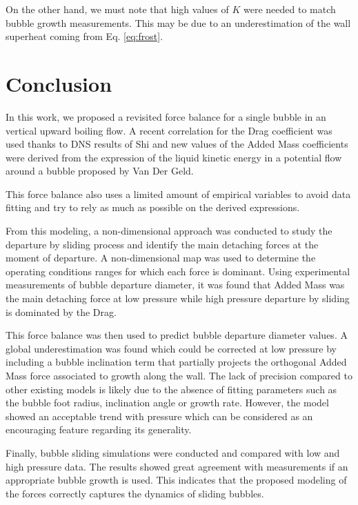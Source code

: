 On the other hand, we must note that high values of $K$ were needed to match bubble growth measurements. This may be due to an underestimation of the wall superheat coming from Eq. \ref{eq:frost}.



\section{Conclusion}\label{ccl}

In this work, we proposed a revisited force balance for a single bubble in an vertical upward boiling flow. A recent correlation for the Drag coefficient was used thanks to DNS results of Shi \etal and new values of the Added Mass coefficients were derived from the expression of the liquid kinetic energy in a potential flow around a bubble proposed by Van Der Geld.

This force balance also uses a limited amount of empirical variables to avoid data fitting and try to rely as much as possible on the derived expressions.

From this modeling, a non-dimensional approach was conducted to study the departure by sliding process and identify the main detaching forces at the moment of departure. A non-dimensional map was used to determine the operating conditions ranges for which each force is dominant. Using experimental measurements of bubble departure diameter, it was found that Added Mass was the main detaching force at low pressure while high pressure departure by sliding is dominated by the Drag.

This force balance was then used to predict bubble departure diameter values. A global underestimation was found which could be corrected at low pressure by including a bubble inclination term that partially projects the orthogonal Added Mass force associated to growth along the wall. The lack of precision compared to other existing models is likely due to the absence of fitting parameters such as the bubble foot radius, inclination angle or growth rate. However, the model showed an acceptable trend with pressure which can be considered as an encouraging feature regarding its generality.

Finally, bubble sliding simulations were conducted and compared with low and high pressure data. The results showed great agreement with measurements if an appropriate bubble growth is used. This indicates that the proposed modeling of the forces correctly captures the dynamics of sliding bubbles.

